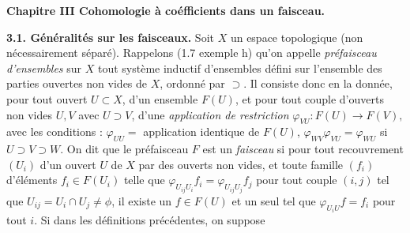 \begin{center}\textbf{Chapitre III Cohomologie à coéfficients dans un faisceau.}\end{center}

\textbf{3.1. Généralités sur les faisceaux.}\quad
{}
Soit $X$ un espace topologique (non nécessairement séparé). Rappelons (1.7
exemple h) qu'on appelle \textit{préfaisceau d'ensembles} sur $X$ tout système
inductif d'ensembles défini sur l'ensemble des parties ouvertes non vides de
$X$, ordonné par $\supset$. Il consiste donc en la donnée, pour tout ouvert
$U\subset X$, d'un ensemble $F(U)$, et pour tout couple d'ouverts non vides
$U,V$ avec $U\supset V$, d'une \textit{application de restriction}
$\varphi_{VU}:F(U)\to F(V),$
avec les conditions : $\varphi_{UU}=$ application identique de $F(U)$,
$\varphi_{WV}\varphi_{VU}=\varphi_{WU}$ si
$U\supset V\supset W$. On dit que le préfaisceau $F$ est un \textit{faisceau}
si pour tout recouvrement $(U_i)$ d'un ouvert $U$ de $X$ par des ouverts non
vides, et toute famille $(f_i)$ d'éléments $f_i\in F(U_i)$ telle que
$\varphi_{U_{ij}U_i}f_i=\varphi_{U_{ij}U_j}f_j$
pour tout couple $(i,j)$ tel que $U_{ij}=U_i\cap U_j\ne\phi$, il existe
un $f\in F(U)$ et un seul tel que $\varphi_{U_iU}f=f_i$ pour tout $i$. Si dans
les définitions précédentes, on suppose

